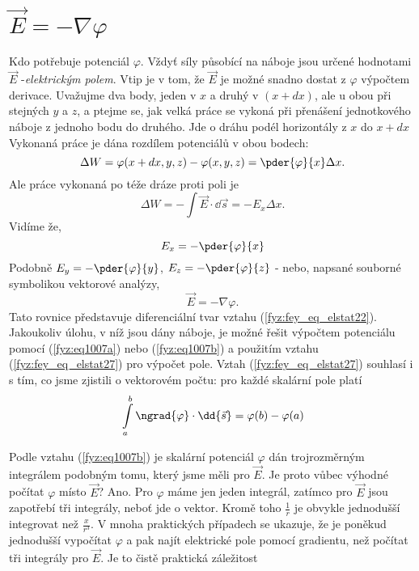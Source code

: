   \section{\texorpdfstring{\(\vec{E} = -\nabla\varphi\)}{Gradient potenciálu}}\label{fyz:IIchapIVsecIV}
    \cite[s.~70]{Feynman02} Kdo potřebuje potenciál \(\varphi\). Vždyť síly působící na náboje jsou 
    určené hodnotami \(\vec{E}\) -\emph{elektrickým polem}. Vtip je v tom, že \(\vec{E}\) je možné 
    snadno dostat z \(\varphi\) výpočtem derivace. Uvažujme dva body, jeden v \(x\) a druhý v \((x 
    + dx)\), ale u obou při stejných \(y\) a \(z\), a ptejme se, jak velká práce se vykoná při 
    přenášení jednotkového náboje z jednoho bodu do druhého. Jde o dráhu podél 	horizontály z \(x\) 
    do \(x + dx\) Vykonaná práce je dána rozdílem potenciálů v obou bodech:
    \begin{equation*}
     \Delta W = \varphi(x+dx, y, z) - \varphi(x, y, z) = \pder{\varphi}{x}\Delta x.
    \end{equation*}
    Ale práce vykonaná po téže dráze proti poli je
    \begin{equation*}
     \Delta W = - \int\vec{E}\cdot\dd{\vec{s}} = - E_x \Delta x.
    \end{equation*}
    Vidíme že,
    \begin{equation}\label{fyz:fey_eq_elstat26}
    E_x = -\pder{\varphi}{x}
    \end{equation}
    Podobně \(E_y = -\pder{\varphi}{y}\), \(E_z = -\pder{\varphi}{z}\) - nebo, napsané souborné 
    symbolikou vektorové analýzy,
    \begin{equation}\label{fyz:fey_eq_elstat27}
    \vec{E} = -\nabla\varphi.
    \end{equation}    
    Tato rovnice představuje diferenciální tvar vztahu (\ref{fyz:fey_eq_elstat22}). Jakoukoliv 
    úlohu, v níž jsou dány náboje, je možné řešit výpočtem potenciálu pomocí 
    (\ref{fyz:eq1007a}) nebo (\ref{fyz:eq1007b}) a použitím vztahu 
    (\ref{fyz:fey_eq_elstat27}) pro výpočet pole. Vztah (\ref{fyz:fey_eq_elstat27}) souhlasí i s 
    tím, co jsme zjistili o vektorovém počtu: pro každé skalární pole platí
    \begin{equation}\label{fyz:fey_eq_elstat28}
     \int\limits_{a}^{b}\ngrad{\varphi}\cdot\dd{\vec{s}} = \varphi(b) - \varphi(a)
    \end{equation}     
    
    Podle vztahu (\ref{fyz:eq1007b}) je skalární potenciál \(\varphi\) dán trojrozměrným 
    integrálem podobným tomu, který jsme měli pro \(\vec{E}\). Je proto vůbec výhodné počítat 
    \(\varphi\) místo \(\vec{E}\)? Ano. Pro \(\varphi\) máme jen jeden integrál, zatímco pro 
    \(\vec{E}\) jsou zapotřebí tři integrály, neboť jde o vektor. Kromě toho \(\frac{1}{r}\) je 
    obvykle jednodušší integrovat než \(\frac{x}{r^3}\). V mnoha praktických případech se ukazuje, 
    že je poněkud jednodušší vypočítat \(\varphi\) a pak najít elektrické pole pomocí gradientu, 
    než počítat tři integrály pro \(\vec{E}\). Je to čistě praktická záležitost
    
